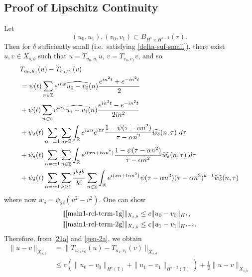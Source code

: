 \documentclass[12pt,reqno]{amsart}
\numberwithin{equation}{section}  %
\newcommand{\rr}{\mathbb{R}}
\newcommand{\zz}{\mathbb{Z}}
\newcommand{\ci}{\mathbb{T}}
\newcommand{\wh}{\widehat}
\begin{document}
\subsection{Proof of Lipschitz Continuity} 
\label{sec:lip-continuity}
%
%
%
%
Let $$(u_0, u_1), (v_0, v_1)  \subset
B_{H^{s} \times H^{s-2}} \left (r \right ).$$ Then for $\delta$ sufficiently
small (i.e.\ satisfying \eqref{delta-suf-small}), there exist $u, v \in
X_{s,b}$ such that $u =
T_{u_0, u_1}u$, $v = T_{v_0, v_1} v$, and so
%
%
\begin{align}
  \notag
    & T_{u_0, u_1}(u) - T_{v_0, v_1}(v)
		\\
    & = \psi(t) \sum_{n \in \zz} e^{inx} \wh{u_{0} - v_{0}}(n) \frac{e^{in^{2}t} + e^{-in^{2}t}}{2} 
\label{main1-rel-term-1g}
  \\
  & + \psi(t) \sum_{n \in \zz} e^{inx}
  \wh{u_{1} - v_{1}}(n)\frac{e^{in^{2}t} - e^{-in^{2}t}}{2 i n^{2}} 
\label{main1-rel-term-2g}
  \\
  & + \psi_{\delta}(t) \sum_{\alpha =  \pm 1} \sum_{n\in \zz} \int_\rr e^{ixn}  
  e^{it \tau} \frac{1 - \psi(\tau -  \alpha n^{2}) 
}{\tau -  \alpha n^{2}} \wh{w_{\delta}}(n, \tau) \ d \tau
\label{main1-rel-term-3g}
  \\
  & + \psi_{\delta}(t) \sum_{\alpha =  \pm 1} \sum_{n\in \zz} \int_\rr e^{i(xn + 
  t \alpha n^{2})}
  \frac{1- \psi(\tau -  \alpha n^{2})}{\tau -  \alpha n^{2}} \wh{w_{\delta}}(n, \tau) \ d \tau
\label{main1-rel-term-4g}
  \\
  & + \psi_{\delta}(t) \sum_{\alpha =  \pm 1}  \sum_{k \ge 1} \frac{i^k t^k}{k!}
  \sum_{n \in \zz} \int_\rr e^{i(xn + t \alpha n^{2} )}
  \psi(\tau -  \alpha n^{2}) (\tau -  \alpha n^{2})^{k-1} \wh{w_{\delta}}(n, \tau)
  \label{main1-rel-term-5g}
\end{align}
%
where now $w_{\delta} = \psi_{2 \delta}(u^{2} - v^{2})$. One can show 
%
\begin{equation}
	\label{gen-2a}
	\begin{split}
    & \| \eqref{main1-rel-term-1g}\|_{X_{s,b}}
		\le c \|u_0 -v_0\|_{H^s},
    \\
    & \| \eqref{main1-rel-term-2g}\|_{X_{s,b}}
    \le c \|u_1 -v_1\|_{H^{s-2}}.
	\end{split}
\end{equation}
%
%
%
%
Therefore, from \eqref{21a} and \eqref{gen-2a}, we obtain
%
%
\begin{equation*}
	\begin{split}
    \|u -v \|_{X_{s,b}}
    & = \|T_{u_0, v_0}(u) - T_{u_1, v_1}(v) \|_{X_{s,b}}
    \\
    & \le
    c \left( \|u_0 -v_0 \|_{H^s\left( \ci \right)} +\|u_1 -v_1
        \|_{H^{s-2}\left( \ci \right)} \right )
        + \frac{1}{2} \|u -v \|_{X_{s,b}}
  \end{split}
\end{equation*}
\end{document}
